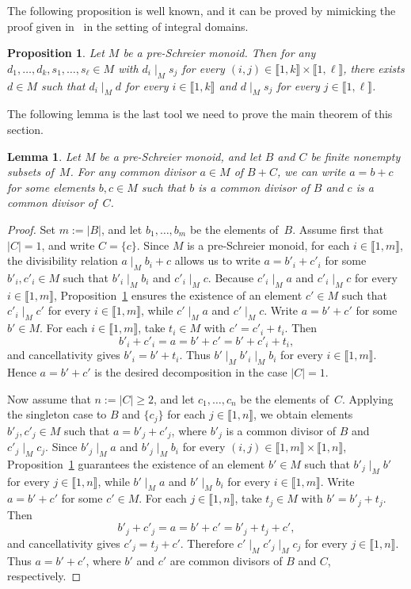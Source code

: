 \documentclass[10pt]{amsart}
\newtheorem{lemma}[theorem]{Lemma}
\newtheorem{proposition}[theorem]{Proposition}
\theoremstyle{definition}
\theoremstyle{remark}
\numberwithin{equation}{section}
\providecommand\ldb{\llbracket}
\providecommand\rdb{\rrbracket}
\begin{document}
The following proposition is well known, and it can be proved by mimicking the proof given in~\cite[Theorem~1.1]{mZ87} in the setting of integral domains.

\begin{proposition} \label{prop:Schreier interpolation}
  Let $M$ be a pre-Schreier monoid. Then for any $d_1, \dots, d_k, s_1, \dots, s_\ell \in M$ with $d_i \mid_M s_j$ for every $(i,j) \in \ldb 1,k \rdb \times \ldb 1, \ell \rdb$, there exists $d \in M$ such that $d_i \mid_M d$ for every $i \in \ldb 1,k \rdb$ and $d \mid_M s_j$ for every $j \in \ldb 1, \ell \rdb$.
\end{proposition}

The following lemma is the last tool we need to prove the main theorem of this section.

\begin{lemma} \label{lem:primal singletons}
  Let $M$ be a pre-Schreier monoid, and let $B$ and $C$ be finite nonempty subsets of~$M$. For any common divisor $a \in M$ of $B+C$, we can write $a = b+c$ for some elements $b,c \in M$ such that $b$ is a common divisor of $B$ and $c$ is a common divisor of~$C$.
\end{lemma}

\begin{proof}
  Set $m:=|B|$, and let $b_1, \dots, b_m$ be the elements of~$B$. Assume first that $|C|=1$, and write $C=\{c\}$. Since $M$ is a pre-Schreier monoid, for each $i \in \ldb 1,m \rdb$, the divisibility relation $a \mid_M b_i+c$ allows us to write $a=b'_i+c'_i$ for some $b'_i,c'_i \in M$ such that $b'_i \mid_M b_i$ and $c'_i \mid_M c$. Because $c'_i \mid_M a$ and $c'_i \mid_M c$ for every $i \in \ldb 1,m \rdb$, Proposition~\ref{prop:Schreier interpolation} ensures the existence of an element $c' \in M$ such that $c'_i \mid_M c'$ for every $i \in \ldb 1,m \rdb$, while $c' \mid_M a$ and $c' \mid_M c$. Write $a=b'+c'$ for some $b' \in M$. For each $i \in \ldb 1,m \rdb$, take $t_i \in M$ with $c'=c'_i+t_i$. Then
  \[
    b'_i+c'_i=a=b'+c'=b'+c'_i+t_i,
  \]
  and cancellativity gives $b'_i=b'+t_i$. Thus $b' \mid_M b'_i \mid_M b_i$ for every $i \in \ldb 1,m \rdb$. Hence $a=b'+c'$ is the desired decomposition in the case $|C|=1$.

  Now assume that $n:=|C|\ge 2$, and let $c_1,\dots,c_n$ be the elements of~$C$. Applying the singleton case to $B$ and $\{c_j\}$ for each $j \in \ldb 1,n \rdb$, we obtain elements $b'_j,c'_j \in M$ such that $a=b'_j+c'_j$, where $b'_j$ is a common divisor of $B$ and $c'_j \mid_M c_j$. Since $b'_j \mid_M a$ and $b'_j \mid_M b_i$ for every $(i,j) \in \ldb 1,m \rdb \times \ldb 1,n \rdb$, Proposition~\ref{prop:Schreier interpolation} guarantees the existence of an element $b' \in M$ such that $b'_j \mid_M b'$ for every $j \in \ldb 1,n \rdb$, while $b' \mid_M a$ and $b' \mid_M b_i$ for every $i \in \ldb 1,m \rdb$. Write $a=b'+c'$ for some $c' \in M$. For each $j \in \ldb 1,n \rdb$, take $t_j \in M$ with $b'=b'_j+t_j$. Then
  \[
    b'_j+c'_j=a=b'+c'=b'_j+t_j+c',
  \]
  and cancellativity gives $c'_j=t_j+c'$. Therefore $c' \mid_M c'_j \mid_M c_j$ for every $j \in \ldb 1,n \rdb$. Thus $a=b'+c'$, where $b'$ and $c'$ are common divisors of $B$ and $C$, respectively.
\end{proof}
\end{document}
